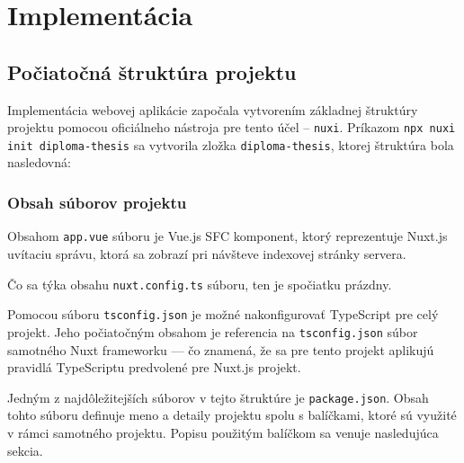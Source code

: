 \chapter {Implementácia}

\section {Počiatočná štruktúra projektu}
Implementácia webovej aplikácie započala vytvorením základnej štruktúry projektu pomocou oficiálneho nástroja pre tento účel -- \texttt{nuxi}. Príkazom \texttt{npx nuxi init diploma-thesis} sa vytvorila zložka \texttt{diploma-thesis}, ktorej štruktúra bola nasledovná:

\begin{figure}[H]
\end{figure}

\clearpage

\subsection {Obsah súborov projektu}
Obsahom \texttt{app.vue} súboru je Vue.js SFC komponent, ktorý reprezentuje Nuxt.js uvítaciu správu, ktorá sa zobrazí pri návšteve indexovej stránky servera.

Čo sa týka obsahu \texttt{nuxt.config.ts} súboru, ten je spočiatku prázdny.

Pomocou súboru \texttt{tsconfig.json} je možné nakonfigurovať TypeScript pre celý projekt. Jeho počiatočným obsahom je referencia na \texttt{tsconfig.json} súbor samotného Nuxt frameworku --- čo znamená, že sa pre tento projekt aplikujú pravidlá TypeScriptu predvolené pre Nuxt.js projekt.

Jedným z najdôležitejších súborov v tejto štruktúre je \texttt{package.json}. Obsah tohto súboru definuje meno a detaily projektu spolu s balíčkami, ktoré sú využité v rámci samotného projektu. Popisu použitým balíčkom sa venuje nasledujúca sekcia.

